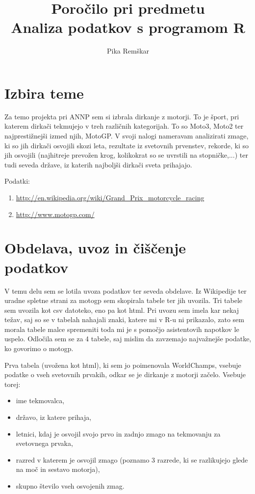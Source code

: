 \documentclass[11pt,a4paper]{article}
\begin{document}
\title{Poročilo pri predmetu \\
Analiza podatkov s programom R}
\author{Pika Remškar}
\maketitle

\section{Izbira teme}

Za temo projekta pri ANNP sem si izbrala dirkanje z motorji. To je šport, pri katerem dirkači tekmujejo v treh različnih kategorijah. To so Moto3, Moto2 ter najprestižnejši izmed njih, MotoGP. V svoji nalogi nameravam analizirati zmage, ki so jih dirkači osvojili skozi leta, rezultate iz svetovnih prvenstev, rekorde, ki so jih osvojili (najhitreje prevožen krog, kolikokrat so se uvrstili na stopničke,...) ter tudi seveda države, iz katerih najboljši dirkači sveta prihajajo. 

Podatki: 
\begin{enumerate}
\item \url{http://en.wikipedia.org/wiki/Grand_Prix_motorcycle_racing}
\item \url{http://www.motogp.com/}
\end{enumerate}

\section{Obdelava, uvoz in čiščenje podatkov}

V temu delu sem se lotila uvoza podatkov ter seveda obdelave. Iz Wikipedije ter uradne spletne strani za motogp sem skopirala tabele ter jih uvozila. Tri tabele sem uvozila kot csv datoteko, eno pa kot html. Pri uvozu sem imela kar nekaj težav, saj so se v tabelah nahajali znaki, katere mi v R-u ni prikazalo, zato sem morala tabele malce spremeniti toda mi je s pomočjo asistentovih napotkov le uspelo. Odločila sem se za 4 tabele, saj mislim da zavzemajo najvažnejše podatke, ko govorimo o motogp.

Prva tabela (uvožena kot html), ki sem jo poimenovala WorldChamps, vsebuje podatke o vseh svetovnih prvakih, odkar se je dirkanje z motorji začelo. Vsebuje torej: 
\begin{itemize}
\item ime tekmovalca, 
\item državo, iz katere prihaja, 
\item letnici, kdaj je osvojil svojo prvo in zadnjo zmago na tekmovanju za svetovnega prvaka, 
\item razred v katerem je osvojil zmago (poznamo 3 razrede, ki se razlikujejo glede na moč in sestavo motorja), 
\item skupno število vseh osvojenih zmag. 
\end{itemize}
\end{document}
